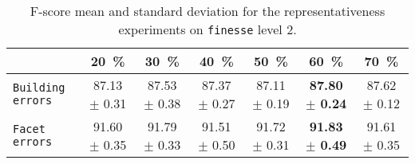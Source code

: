         \begin{table}
            \footnotesize
            \centering
            \begin{tabular}{x{2cm} c c c c c c}
                \toprule
                & \textbf{\SI{20}{\percent}} & \textbf{\SI{30}{\percent}} & \textbf{\SI{40}{\percent}} & \textbf{\SI{50}{\percent}} & \textbf{\SI{60}{\percent}} & \textbf{\SI{70}{\percent}}\\
                \midrule
                \texttt{Building errors} & 87.13 $\pm$ 0.31 & 87.53 $\pm$ 0.38 & 87.37 $\pm$ 0.27 & 87.11 $\pm$ 0.19 & \textbf{87.80 $\pm$ 0.24} & 87.62 $\pm$ 0.12 \\
                \midrule
                \texttt{Facet errors} & 91.60 $\pm$ 0.35 & 91.79 $\pm$ 0.33 & 91.51 $\pm$ 0.50 & 91.72 $\pm$ 0.31 & \textbf{91.83 $\pm$ 0.49} & 91.61 $\pm$ 0.35 \\
                \bottomrule
            \end{tabular}
            \caption{\label{tab::f_score_representativeness_f2} F-score mean and standard deviation for the representativeness experiments on \texttt{finesse} level 2.}
        \end{table}
    